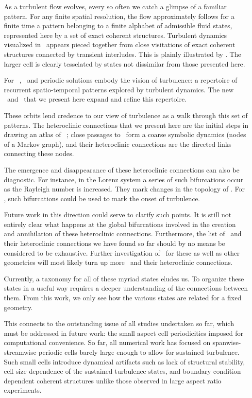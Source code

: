 

As a turbulent flow evolves, every so often we
catch a glimpse of a familiar pattern. For any finite spatial
resolution, the flow approximately follows for a finite time
a pattern belonging to a finite alphabet of admissible fluid states,
represented here by a set of exact coherent structures.
Turbulent dynamics visualized in \statesp\ appears pieced together from
close visitations of exact coherent structures
connected by transient interludes.  This is plainly illustrated
by .  The larger cell is clearly tesselated by states
not dissimilar from those presented here.

For \KS\ \eqva, \reqva\ and
periodic solutions embody the vision of turbulence:
a repertoire of recurrent spatio-temporal
patterns explored by turbulent dynamics.
The new \eqva\ and \reqva\ that we present here
expand and refine this repertoire.

These orbits lend credence to our view of
turbulence as a walk through this set of patterns.
The heteroclinic connections that we present here are the initial steps in drawing
an atlas of \KS\ \statesp; close passages to \eqva\ form a coarse symbolic
dynamics (nodes of a Markov graph), and their heteroclinic connections are the directed links
connecting these nodes.

The emergence and disappearance of these heteroclinic connections can also be
diagnostic. For instance, in the Lorenz system a series of such bifurcations occur
as the Rayleigh number is increased.
They mark changes
in the topology of \statesp.  For \KS, such bifurcations could be used
to mark the onset of turbulence.

Future work in this direction could serve to clarify such points.  It is still
not entirely clear what happens at the global bifurcations involved in the creation
and annihilation of these heteroclinic connections.  Furthermore,  the list of \eqva\ and
their heteroclinic connections we have found so far should by no means be considered to be exhaustive.
Further investigation of \KS\ for these as well as other geometries
will most likely turn up more \eqva\ and their heteroclinic connections.

Currently, a taxonomy for all of these myriad states eludes us.
To organize these states in a useful way requires
a deeper understanding of the connections between them.
From this work, we only see how the various states are related for a fixed geometry.

This connects to the outstanding issue of all studies undertaken
so far, which must be addressed in future work:
the small aspect cell periodicities imposed for computational convenience.
So far, all numerical
work has focused on spanwise-streamwise periodic cells barely large
enough to allow for sustained turbulence. Such small cells introduce dynamical
artifacts such as lack of structural stability, cell-size dependence of the
sustained turbulence states, and boundary-condition dependent coherent structures
unlike those observed in large aspect ratio experiments.
